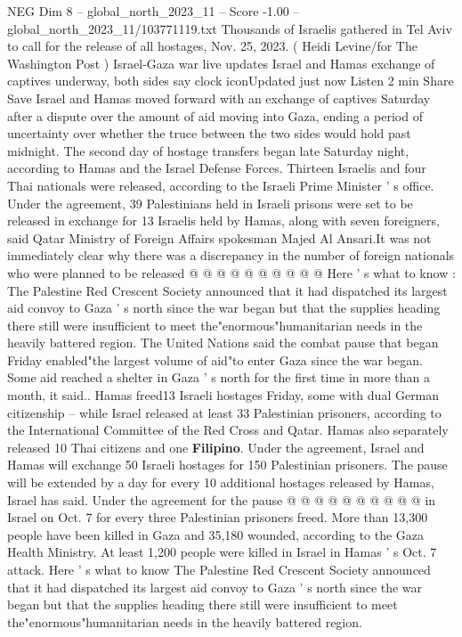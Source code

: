 \begin{textsample}{NEG Dim 8 – global\_north\_2023\_11 – Score -1.00 – global\_north\_2023\_11/103771119.txt}  \label{ex:f8_neg_260}
Thousands of Israelis gathered in Tel Aviv to call for the release of all hostages, Nov. 25, 2023. ( Heidi Levine/for The Washington Post ) Israel-Gaza war live updates Israel and Hamas exchange of captives underway, both sides say clock iconUpdated just now Listen 2 min Share Save Israel and Hamas moved forward with an exchange of captives Saturday after a dispute over the amount of aid moving into Gaza, ending a period of uncertainty over whether the truce between the two sides would hold past midnight.
The second day of hostage transfers began late Saturday night, according to Hamas and the Israel Defense Forces.
Thirteen Israelis and four Thai nationals were released, according to the Israeli Prime Minister ' s office.
Under the agreement, 39 Palestinians held in Israeli prisons were set to be released in exchange for 13 Israelis held by Hamas, along with seven foreigners, said Qatar Ministry of Foreign Affairs spokesman Majed Al Ansari.It was not immediately clear why there was a discrepancy in the number of foreign nationals who were planned to be released @ @ @ @ @ @ @ @ @ @ Here ' s what to know : The Palestine Red Crescent Society announced that it had dispatched its largest aid convoy to Gaza ' s north since the war began but that the supplies heading there still were insufficient to meet the"enormous"humanitarian needs in the heavily battered region.
The United Nations said the combat pause that began Friday enabled"the largest volume of aid"to enter Gaza since the war began.
Some aid reached a shelter in Gaza ' s north for the first time in more than a month, it said..
Hamas freed13 Israeli hostages Friday, some with dual German citizenship -- while Israel released at least 33 Palestinian prisoners, according to the International Committee of the Red Cross and Qatar.
Hamas also separately released 10 Thai citizens and one \textbf{Filipino}.
Under the agreement, Israel and Hamas will exchange 50 Israeli hostages for 150 Palestinian prisoners.
The pause will be extended by a day for every 10 additional hostages released by Hamas, Israel has said.
Under the agreement for the pause @ @ @ @ @ @ @ @ @ @ in Israel on Oct. 7 for every three Palestinian prisoners freed.
More than 13,300 people have been killed in Gaza and 35,180 wounded, according to the Gaza Health Ministry.
At least 1,200 people were killed in Israel in Hamas ' s Oct. 7 attack.
Here ' s what to know The Palestine Red Crescent Society announced that it had dispatched its largest aid convoy to Gaza ' s north since the war began but that the supplies heading there still were insufficient to meet the"enormous"humanitarian needs in the heavily battered region.

\end{textsample}
